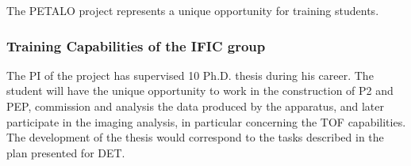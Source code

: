 The PETALO project represents a unique opportunity for training students. 

\subsubsection*{Training Capabilities of the IFIC group}

The PI of the project has supervised  10 Ph.D. thesis during his career. The student will have the unique opportunity to work in the construction of P2 and PEP, commission and analysis the data produced by the apparatus, and later participate in the imaging analysis, in particular concerning the TOF capabilities. The development of the thesis would correspond to the tasks described in the plan presented for DET. 

%
